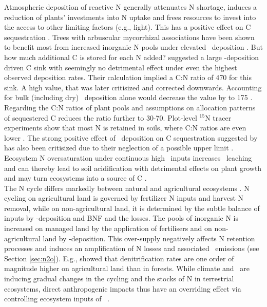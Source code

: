 Atmospheric deposition of reactive N generally attenuates N shortage, induces a reduction of plants' investments into N uptake and frees resources to invest into the access to other limiting factors (e.g., light). This has a positive effect on C sequestration \citep{magnani07, thomas10}. Trees with arbuscular mycorrhizal associations have been shown to benefit most from increased inorganic N pools under elevated \nr\ deposition \citep{thomas10}. But how much additional C is stored for each N added? \citet{magnani07} suggested a large \nr -deposition driven C sink with seemingly no detrimental effect under even the highest observed deposition rates. Their calculation implied a C:N ratio of 470 for this sink. A high value, that was later critisized and corrected downwards. Accounting for bulk (including dry) \nr\ deposition alone would decrease the value by \citet{magnani07} to 175 \citep{devries08}. Regarding the C:N ratios of plant pools and assumptions on allocation patterns of sequestered C reduces the ratio further to 30-70\citep{devries08, sutton08, thomas10}. Plot-level $^{15}$N tracer experiments show that most N is retained in soils, where C:N ratios are even lower \citep{nadelhoffer99, liugreaver09}. The strong positive effect of \nr\ deposition on C sequestration suggested by \citet{magnani07} has also been critisized due to their neglection of a possible upper limit \citep{deschrijver08}. Ecosystem N oversaturation under continuous high \nr\ inputs increases \nooo\ leaching and can thereby lead to soil acidification with detrimental effects on plant growth and may turn ecosystems into a source of C \citep{ena}.\\

The N cycle differs markedly between natural and agricultural ecosystems \citep{ena, butterbachbahl11}. N cycling on agricultural land is governed by fertilizer N inputs and harvest N removal, while on non-agricultural land, it is determined by the subtle balance of inputs by \nr -deposition and BNF and the losses. The pools of inorganic N is increased on managed land by the application of fertilisers and on non-agricultural land by \nr -deposition. This over-supply negatively affects N retention processes and induces an amplification of N losses and associated \nno\ emissions (see Section \ref{sec:n2o}). E.g., \citet{barton99} showed that denitrification rates are one order of magnitude higher on agricultural land than in forests. While climate and \coo\ are inducing gradual changes in the cycling and the stocks of N in terrestrial ecosystems, direct anthropogenic impacts thus have an overriding effect via controlling ecosystem inputs of \nr\ \citep{butterbachbahl11}. 

